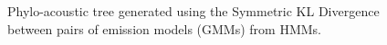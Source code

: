 \documentclass[pdftex,11pt,a4paper]{article}
\theoremstyle{definition}
\theoremstyle{remark}
\begin{document}
\begin{figure}
\noindent{}
    \caption{Phylo-acoustic tree generated using the Symmetric KL Divergence between pairs of emission models (GMMs) from HMMs.}
    \label{fig:gmmskld}
\end{figure}
\end{document}
